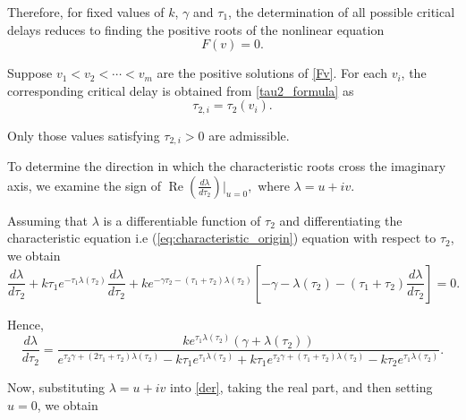 \documentclass[11pt]{article}
\theoremstyle{remark}
\begin{document}
{Therefore, for fixed values of $k$, $\gamma$ and $\tau_1$, the determination of all possible critical delays reduces to finding the positive roots of the nonlinear equation
\[
F(v)=0.
\]

Suppose
$
v_1<v_2<\cdots<v_m
$
are the positive solutions of \eqref{Fv}. For each $v_i$, the corresponding critical delay is obtained from \eqref{tau2_formula} as
\[
\tau_{2,i}=\tau_2(v_i).
\]

Only those values satisfying
$
\tau_{2,i}>0
$
are admissible.

To determine the direction in which the characteristic roots cross the
imaginary axis, we examine the sign of
$
\operatorname{Re}\!\left(\frac{d\lambda}{d\tau_2}\right)\big|_{u=0},
$
where $\lambda=u+iv$.


Assuming that $\lambda$ is a differentiable function of $\tau_2$ and
differentiating the characteristic equation i.e (\ref{eq:characteristic_origin}) equation with respect to $\tau_2$, we obtain
\begin{equation}
\frac{d\lambda}{d\tau_2}
+k\tau_1e^{-\tau_1\lambda(\tau_2)}
\frac{d\lambda}{d\tau_2}
+k e^{-\gamma\tau_2-(\tau_1+\tau_2)\lambda(\tau_2)}
\left[
-\gamma
-\lambda(\tau_2)
-(\tau_1+\tau_2)\frac{d\lambda}{d\tau_2}
\right]
=0.
\end{equation}

Hence,
\begin{equation}
\frac{d\lambda}{d\tau_2}
=
\frac{
k e^{\tau_1\lambda(\tau_2)}
\left(\gamma+\lambda(\tau_2)\right)
}{
e^{\tau_2\gamma+(2\tau_1+\tau_2)\lambda(\tau_2)}
-
k\tau_1 e^{\tau_1\lambda(\tau_2)}
+
k\tau_1 e^{\tau_2\gamma+(\tau_1+\tau_2)\lambda(\tau_2)}
-
k\tau_2 e^{\tau_1\lambda(\tau_2)}
}.
\label{der}
\end{equation}

Now, substituting $\lambda=u+iv$ into \eqref{der}, taking the real part,
and then setting $u=0$, we obtain

}
\end{document}
